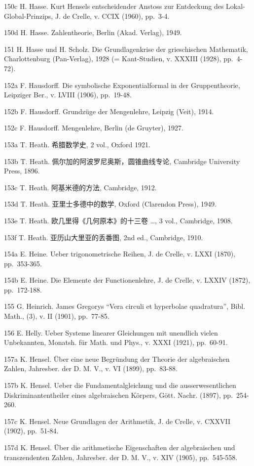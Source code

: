 150c H. Hasse. Kurt Hensels entscheidender Anstoss zur Entdeckung des Lokal-Global-Prinzips, J. de Crelle, v. CCIX (1960), pp.~3-4.

150d H. Hasse. Zahlentheorie, Berlin (Akad. Verlag), 1949.

151 H. Hasse und H. Scholz. Die Grundlagenkrise der grieschischen Mathematik, Charlottenburg (Pan-Verlag), 1928 (= Kant-Studien, v. XXXIII (1928), pp.~4-72).

152a F. Hausdorff. Die symbolische Exponentialformal in der Gruppentheorie, Leipziger Ber., v. LVIII (1906), pp.~19-48.

152b F. Hausdorff. Grundzüge der Mengenlehre, Leipzig (Veit), 1914.

152c F. Hausdorff. Mengenlehre, Berlin (de Gruyter), 1927.

153a T. Heath. 希腊数学史, 2 vol., Oxford 1921.

153b T. Heath. 佩尔加的阿波罗尼奥斯，圆锥曲线专论, Cambridge University Press, 1896.

153c T. Heath. 阿基米德的方法, Cambridge, 1912.

153d T. Heath. 亚里士多德中的数学, Oxford (Clarendon Press), 1949.

153e T. Heath. 欧几里得《几何原本》的十三卷 \ldots, 3 vol., Cambridge, 1908.

153f T. Heath. 亚历山大里亚的丢番图, 2nd ed., Cambridge, 1910.

154a E. Heine. Ueber trigonometrische Reihen, J. de Crelle, v. LXXI (1870), pp.~353-365.

154b E. Heine. Die Elemente der Functionenlehre, J. de Crelle, v. LXXIV (1872), pp.~172-188.

155 G. Heinrich. James Gregorys ``Vera circuli et hyperbolae quadratura'', Bibl. Math., (3), v. II (1901), pp.~77-85.

156 E. Helly. Ueber Systeme linearer Gleichungen mit unendlich vielen Unbekannten, Monatsh. für Math. und Phys., v. XXXI (1921), pp.~60-91.

157a K. Hensel. Über eine neue Begründung der Theorie der algebraischen Zahlen, Jahresber. der D. M. V., v. VI (1899), pp.~83-88.

157b K. Hensel. Ueber die Fundamentalgleichung und die ausserwesentlichen Diskriminantentheiler eines algebraischen Körpers, Gött. Nachr. (1897), pp.~254-260.

157c K. Hensel. Neue Grundlagen der Arithmetik, J. de Crelle, v. CXXVII (1902), pp.~51-84.

157d K. Hensel. Über die arithmetische Eigenschaften der algebraischen und transzendenten Zahlen, Jahresber. der D. M. V., v. XIV (1905), pp.~545-558.


